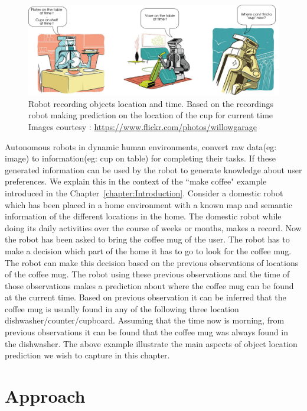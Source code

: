 \begin{figure}[htp]
\centering
\includegraphics[scale=0.4]{pictures/scenario.png}
\caption[Example scenario of robot recording objects location and time]{Robot recording objects location and time. Based on the
recordings robot making prediction on the location of the cup for current time
Images courtesy : \url{https://www.flickr.com/photos/willowgarage} }
\label{scenario}
\end{figure}

Autonomous robots in dynamic human environments, convert raw data(eg: image) to information(eg: cup on table) for completing their tasks. If these generated information can be used by the robot to generate knowledge about user preferences. We explain this in the context of the ``make coffee" example introduced in the Chapter~\ref{chapter:Introduction}. 
Consider a domestic robot which has been placed in a home environment with a known map and semantic information of the different locations in the home. The domestic robot while doing its daily activities over the course of weeks or months, makes a record. Now the robot has been asked to bring the coffee mug of the user.
The robot has to make a decision which part of the home it has to go to look for
the coffee mug. The robot can make this decision based on the previous observations of locations of the coffee mug.
The robot using these previous observations and the time of those observations 
makes a prediction about where the coffee mug can be found at the current time.
Based on previous observation it can be inferred that the coffee mug is usually found in any of the following three location dishwasher/counter/cupboard. Assuming that the time now is morning, from previous observations it can be found that the coffee mug was always found  in the dishwasher. The above example illustrate the main aspects of object location prediction we wish to capture in this chapter.

\section{Approach}


